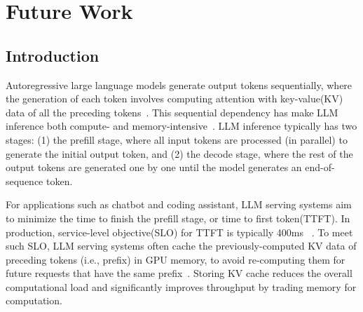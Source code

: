 \chapter{Future Work}
\label{chap:future}

\newcommand{\llm}{LLM\xspace}
\newcommand{\llmfull}{Large Language Model\xspace}
\newcommand{\kv}{KV\xspace}
\newcommand{\kvfull}{key-value\xspace}
\newcommand{\kvcache}{\kv cache\xspace}
\newcommand{\kvcachefull}{\kvfull cache\xspace}
\newcommand{\gptfast}{gpt-fast\xspace}
\newcommand{\cxl}{CXL\xspace}
\newcommand{\cxlfull}{Compute Express Link\xspace}
\newcommand{\api}{API\xspace}
\newcommand{\gpu}{GPU\xspace}
\newcommand{\ssd}{SSD\xspace}
\newcommand{\slo}{SLO\xspace}
\newcommand{\slofull}{service-level objective\xspace}
\newcommand{\roifull}{Return on Investment\xspace}
\newcommand{\roi}{ROI\xspace}
\newcommand{\apisave}{\texttt{save}\xspace}
\newcommand{\apiload}{\texttt{load}\xspace}
\newcommand{\ttft}{TTFT\xspace}
\newcommand{\ttftfull}{time to first token\xspace}
\newcommand{\llama}{LLaMA\xspace}
\newcommand{\asic}{ASIC\xspace}

\newcommand{\tool}{\textit{KVExpress}\xspace}

\newcommand{\sam}[1]{{\color{blue}#1}\xspace}
\newcommand{\ltp}[1]{{\color{magenta}#1}\xspace}
\newcommand{\Space}[1]{\xspace}
\newcommand{\fix}[1]{{\color{red}#1}\xspace}

\newcommand{\para}[1]{\vspace{3pt}\noindent \textbf{#1.}~~}


\section{Introduction}
Autoregressive large language models generate output tokens sequentially, where the generation of each token involves computing attention with \kvfull (\kv) data of all the preceding tokens~\cite{gpt1, gpt2, gpt3}. 
This sequential dependency has make \llm inference both compute- and memory-intensive~\cite{gpt4}.
\llm inference typically has two stages: (1) the prefill stage, where all input tokens are processed (in parallel) to generate the initial output token, and (2) the decode stage, where the rest of the output tokens are generated one by one until the model generates an end-of-sequence token. 


For applications such as chatbot and coding assistant, \llm serving systems aim to minimize the time to finish the prefill stage, or \ttftfull (\ttft).
In production, \slofull (\slo) for \ttft is typically 400ms ~\cite{distserve}.
To meet such \slo, \llm serving systems often cache the previously-computed \kv data of preceding tokens (i.e., prefix) in GPU memory\Space{ incurred from the attention mechanism}, to avoid re-computing them for future requests that have the same prefix~\cite{pagedattenion, distserve, memserve}. 
Storing \kvcache reduces the overall computational load and significantly improves throughput by trading memory for computation. 


